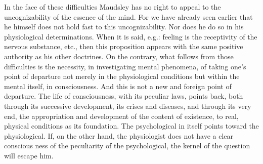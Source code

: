 \documentclass[12pt,a4paper,openany]{book}
\newcommand{\opage}[1]{\marginnote{\footnotesize\textit{[#1]}}}
\begin{document}
In the face of these difficulties Maudsley has no right
to appeal to the uncognizability of the essence of the mind.
For we have already seen earlier that he himself does not hold fast to
this uncognizability. Nor does he do so in his
physiological determinations. When it is said, e.g.: feeling
is the receptivity of the nervous substance, etc., then this
proposition appears with the same positive authority as his
other doctrines. On the contrary, what follows from those difficulties is
the necessity, in investigating mental phenomena,
of taking one's point of departure not merely in the physiological
conditions but within the mental itself, in consciousness.
And this is not a new and foreign point of departure. The life of consciousness,
with its peculiar laws, points back, both through
its successive development, its crises and diseases, and through
its very end, the appropriation and development of the content
of existence, to real, physical conditions as its
foundation. The psychological in itself points toward the
physiological. If, on the other hand, the physiologist does not have a clear conscious%
\opage{319}ness of the peculiarity of the psychological, the kernel of the question
will escape him.
\end{document}
